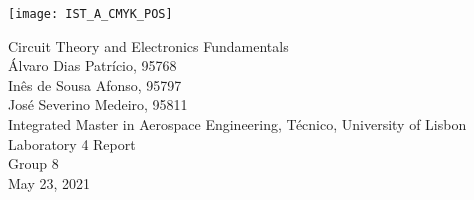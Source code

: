 
\thispagestyle {empty}

\texttt{[image: IST\_A\_CMYK\_POS]}

\begin{center}
%
\vspace{1.0cm}

\vspace{1cm}
{\FontLb Circuit Theory and Electronics Fundamentals} \\ %
\vspace{1.0cm}
{\FontSn Álvaro Dias Patrício, 95768} \\
\vspace{0.5cm}
{\FontSn Inês de Sousa Afonso, 95797} \\
\vspace{0.5cm}
{\FontSn José Severino Medeiro, 95811} \\
\vspace{1.0cm}
{\FontSn Integrated Master in Aerospace Engineering, Técnico, University of Lisbon} \\ %
\vspace{1.0cm}
{\FontSn Laboratory 4 Report} \\
\vspace{0.5cm}
{\FontSn Group 8} \\
\vspace{1.0cm}
{\FontSn May 23, 2021} \\ %
%
\end{center}

